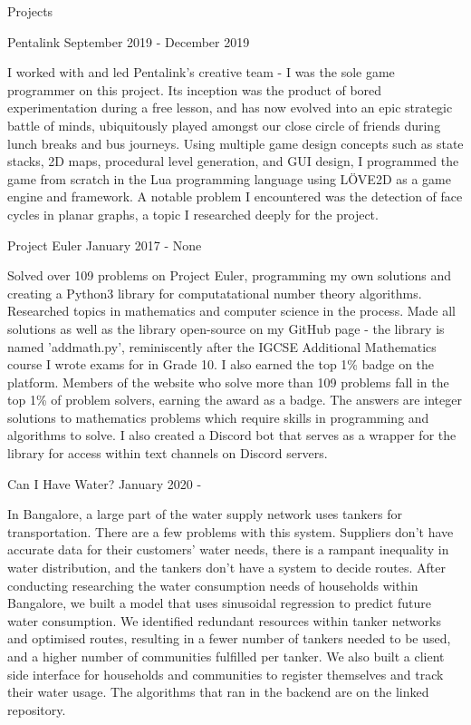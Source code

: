 \documentclass{resume} %
\begin{document}
\begin{rSection}{Projects}


\begin{rSubsection}{ Pentalink }{ September 2019 - December 2019 }{}
\item I worked with and led Pentalink's creative team - I was the sole game programmer on this project. Its inception was the product of bored experimentation during a free lesson, and has now evolved into an epic strategic battle of minds, ubiquitously played amongst our close circle of friends during lunch breaks and bus journeys. Using multiple game design concepts such as state stacks, 2D maps, procedural level generation, and GUI design, I programmed the game from scratch in the Lua programming language using LÖVE2D as a game engine and framework. A notable problem I encountered was the detection of face cycles in planar graphs, a topic I researched deeply for the project.
\end{rSubsection}



\begin{rSubsection}{ Project Euler }{ January 2017 - None }{}
\item Solved over 109 problems on Project Euler, programming my own solutions and creating a Python3 library for computatational number theory algorithms. Researched topics in mathematics and computer science in the process. Made all solutions as well as the library open-source on my GitHub page - the library is named 'addmath.py', reminiscently after the IGCSE Additional Mathematics course I wrote exams for in Grade 10. I also earned the top 1\% badge on the platform. Members of the website who solve more than 109 problems fall in the top 1\% of problem solvers, earning the award as a badge. The answers are integer solutions to mathematics problems which require skills in programming and algorithms to solve. I also created a Discord bot that serves as a wrapper for the library for access within text channels on Discord servers.
\end{rSubsection}



\begin{rSubsection}{ Can I Have Water? }{ January 2020 -  }{}
\item In Bangalore, a large part of the water supply network uses tankers for transportation. There are a few problems with this system. Suppliers don’t have accurate data for their customers’ water needs, there is a rampant inequality in water distribution, and the tankers don't have a system to decide routes. After conducting researching the water consumption needs of households within Bangalore, we built a model that uses sinusoidal regression to predict future water consumption. We identified redundant resources within tanker networks and optimised routes, resulting in a fewer number of tankers needed to be used, and a higher number of communities fulfilled per tanker. We also built a client side interface for households and communities to register themselves and track their water usage. The algorithms that ran in the backend are on the linked repository.
\end{rSubsection}




\end{rSection}
\end{document}
